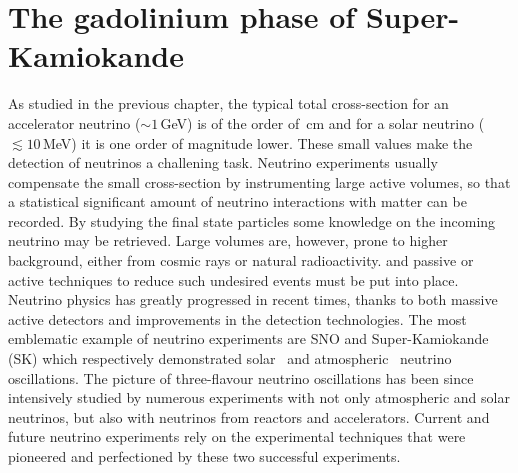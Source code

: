 \chapter{The gadolinium phase of Super-Kamiokande}
\label{cha:skgd}

As studied in the previous chapter, the typical total cross-section for an accelerator neutrino \mbox{($\sim1$\,GeV)} %
is of the order of \,cm and for a solar neutrino ($\lesssim10$\,MeV) %
it is one order of magnitude lower.
These small values make the detection of neutrinos a challening task.
Neutrino experiments usually compensate the small cross-section by instrumenting large active volumes, %
so that a statistical significant amount of neutrino interactions with matter can be recorded.
By studying the final state particles some knowledge on the incoming neutrino may be retrieved.
Large volumes are, however, prone to higher background, either from cosmic rays or natural radioactivity.
and passive or active techniques to reduce such undesired events must be put into place.
Neutrino physics has greatly progressed in recent times, thanks to both massive active detectors and %
improvements in the detection technologies.
The most emblematic example of neutrino experiments are SNO and Super-Kamiokande (SK) %
which respectively demonstrated solar~\cite{Aharmim:2005gt} and atmospheric~\cite{Fukuda:1998mi} neutrino oscillations.
The picture of three-flavour neutrino oscillations has been since intensively studied %
by numerous experiments with not only atmospheric and solar neutrinos, but also with neutrinos from reactors and accelerators.
Current and future neutrino experiments rely on the experimental techniques that were pioneered and perfectioned %
by these two successful experiments.


